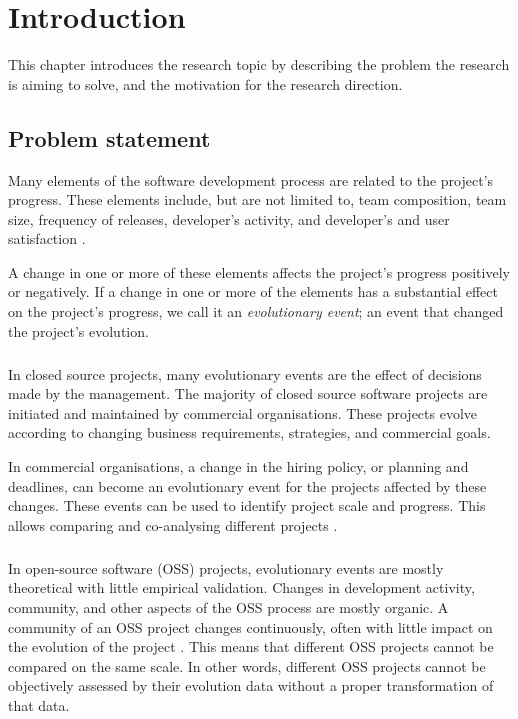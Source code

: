 \chapter{Introduction}
\label{introduction}

This chapter introduces the research topic by describing the problem the
research is aiming to solve, and the motivation for the research direction.

\section{Problem statement}
Many elements of the software development process are related to the project's
progress. These elements include, but are not limited to, team composition,
team size, frequency of releases, developer's activity, and developer's and
user satisfaction \cite{crowston2006, delone1992, samoladas2010}.

A change in one or more of these elements affects the project's progress
positively or negatively. If a change in one or more of the elements has a
substantial effect on the project's progress, we call it an \emph{evolutionary
event}\rm; an event that changed the project's evolution.

\paragraph{}
In closed source projects, many evolutionary events are the effect of decisions
made by the management. The majority of closed source software projects are
initiated and maintained by commercial organisations. These projects evolve
according to changing business requirements, strategies, and commercial goals.

In commercial organisations, a change in the hiring policy, or planning and
deadlines, can become an evolutionary event for the projects affected by these
changes. These events can be used to identify project scale and progress. This
allows comparing and co-analysing different projects \cite{karus2013}.

\paragraph{}
In open-source software (OSS) projects, evolutionary events are mostly
theoretical with little empirical validation. Changes in development activity,
community, and other aspects of the OSS process are mostly organic. A community
of an OSS project changes continuously, often with little impact on the
evolution of the project \cite{androutsellis}. This means that different OSS
projects cannot be compared on the same scale. In other words, different OSS
projects cannot be objectively assessed by their evolution data without a
proper transformation of that data.

